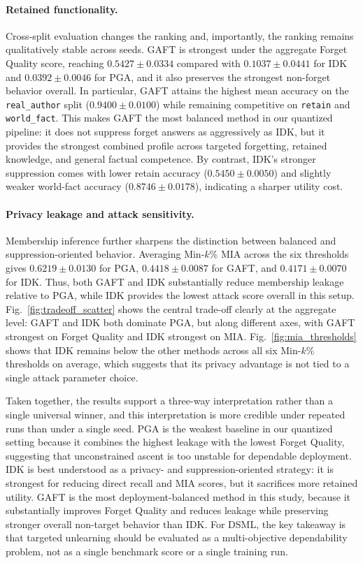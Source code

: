 \documentclass[conference]{IEEEtran}
\begin{document}
\paragraph{Retained functionality.}
Cross-split evaluation changes the ranking and, importantly, the ranking remains qualitatively stable across seeds. GAFT is strongest under the aggregate Forget Quality score, reaching $0.5427 \pm 0.0334$ compared with $0.1037 \pm 0.0441$ for IDK and $0.0392 \pm 0.0046$ for PGA, and it also preserves the strongest non-forget behavior overall. In particular, GAFT attains the highest mean accuracy on the \texttt{real\_author} split ($0.9400 \pm 0.0100$) while remaining competitive on \texttt{retain} and \texttt{world\_fact}. This makes GAFT the most balanced method in our quantized pipeline: it does not suppress forget answers as aggressively as IDK, but it provides the strongest combined profile across targeted forgetting, retained knowledge, and general factual competence. By contrast, IDK's stronger suppression comes with lower retain accuracy ($0.5450 \pm 0.0050$) and slightly weaker world-fact accuracy ($0.8746 \pm 0.0178$), indicating a sharper utility cost.

\paragraph{Privacy leakage and attack sensitivity.}
Membership inference further sharpens the distinction between balanced and suppression-oriented behavior. Averaging Min-$k$\% MIA across the six thresholds gives $0.6219 \pm 0.0130$ for PGA, $0.4418 \pm 0.0087$ for GAFT, and $0.4171 \pm 0.0070$ for IDK. Thus, both GAFT and IDK substantially reduce membership leakage relative to PGA, while IDK provides the lowest attack score overall in this setup. Fig.~\ref{fig:tradeoff_scatter} shows the central trade-off clearly at the aggregate level: GAFT and IDK both dominate PGA, but along different axes, with GAFT strongest on Forget Quality and IDK strongest on MIA. Fig.~\ref{fig:mia_thresholds} shows that IDK remains below the other methods across all six Min-$k$\% thresholds on average, which suggests that its privacy advantage is not tied to a single attack parameter choice.

Taken together, the results support a three-way interpretation rather than a single universal winner, and this interpretation is more credible under repeated runs than under a single seed. PGA is the weakest baseline in our quantized setting because it combines the highest leakage with the lowest Forget Quality, suggesting that unconstrained ascent is too unstable for dependable deployment. IDK is best understood as a privacy- and suppression-oriented strategy: it is strongest for reducing direct recall and MIA scores, but it sacrifices more retained utility. GAFT is the most deployment-balanced method in this study, because it substantially improves Forget Quality and reduces leakage while preserving stronger overall non-target behavior than IDK. For DSML, the key takeaway is that targeted unlearning should be evaluated as a multi-objective dependability problem, not as a single benchmark score or a single training run.
\end{document}
